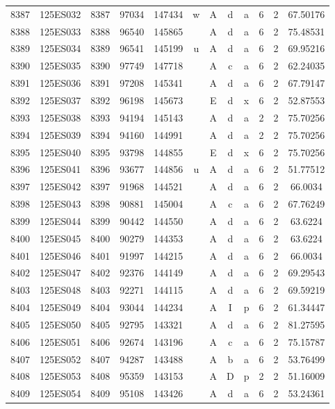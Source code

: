 \begin{tabular}{|*{12}{c|}}
8387 & 125ES032 & 8387 & 97034 & 147434 & w & A & d & a & 6 & 2 & 67.50176 \\ 
8388 & 125ES033 & 8388 & 96540 & 145865 &  & A & d & a & 6 & 2 & 75.48531 \\ 
8389 & 125ES034 & 8389 & 96541 & 145199 & u & A & d & a & 6 & 2 & 69.95216 \\ 
8390 & 125ES035 & 8390 & 97749 & 147718 &  & A & c & a & 6 & 2 & 62.24035 \\ 
8391 & 125ES036 & 8391 & 97208 & 145341 &  & A & d & a & 6 & 2 & 67.79147 \\ 
8392 & 125ES037 & 8392 & 96198 & 145673 &  & E & d & x & 6 & 2 & 52.87553 \\ 
8393 & 125ES038 & 8393 & 94194 & 145143 &  & A & d & a & 2 & 2 & 75.70256 \\ 
8394 & 125ES039 & 8394 & 94160 & 144991 &  & A & d & a & 2 & 2 & 75.70256 \\ 
8395 & 125ES040 & 8395 & 93798 & 144855 &  & E & d & x & 6 & 2 & 75.70256 \\ 
8396 & 125ES041 & 8396 & 93677 & 144856 & u & A & d & a & 6 & 2 & 51.77512 \\ 
8397 & 125ES042 & 8397 & 91968 & 144521 &  & A & d & a & 6 & 2 & 66.0034 \\ 
8398 & 125ES043 & 8398 & 90881 & 145004 &  & A & c & a & 6 & 2 & 67.76249 \\ 
8399 & 125ES044 & 8399 & 90442 & 144550 &  & A & d & a & 6 & 2 & 63.6224 \\ 
8400 & 125ES045 & 8400 & 90279 & 144353 &  & A & d & a & 6 & 2 & 63.6224 \\ 
8401 & 125ES046 & 8401 & 91997 & 144215 &  & A & d & a & 6 & 2 & 66.0034 \\ 
8402 & 125ES047 & 8402 & 92376 & 144149 &  & A & d & a & 6 & 2 & 69.29543 \\ 
8403 & 125ES048 & 8403 & 92271 & 144115 &  & A & d & a & 6 & 2 & 69.59219 \\ 
8404 & 125ES049 & 8404 & 93044 & 144234 &  & A & I & p & 6 & 2 & 61.34447 \\ 
8405 & 125ES050 & 8405 & 92795 & 143321 &  & A & d & a & 6 & 2 & 81.27595 \\ 
8406 & 125ES051 & 8406 & 92674 & 143196 &  & A & c & a & 6 & 2 & 75.15787 \\ 
8407 & 125ES052 & 8407 & 94287 & 143488 &  & A & b & a & 6 & 2 & 53.76499 \\ 
8408 & 125ES053 & 8408 & 95359 & 143153 &  & A & D & p & 2 & 2 & 51.16009 \\ 
8409 & 125ES054 & 8409 & 95108 & 143426 &  & A & d & a & 6 & 2 & 53.24361 \\ 

\end{tabular}
